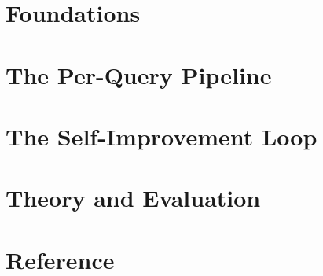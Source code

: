 \documentclass[11pt,a4paper,oneside]{book}
\begin{document}
\frontmatter

\tableofcontents

\mainmatter

\part{Foundations}

\part{The Per-Query Pipeline}

\part{The Self-Improvement Loop}

\part{Theory and Evaluation}

\appendix
\part{Reference}

\backmatter
\printbibliography[heading=bibintoc,title={References}]
\end{document}

